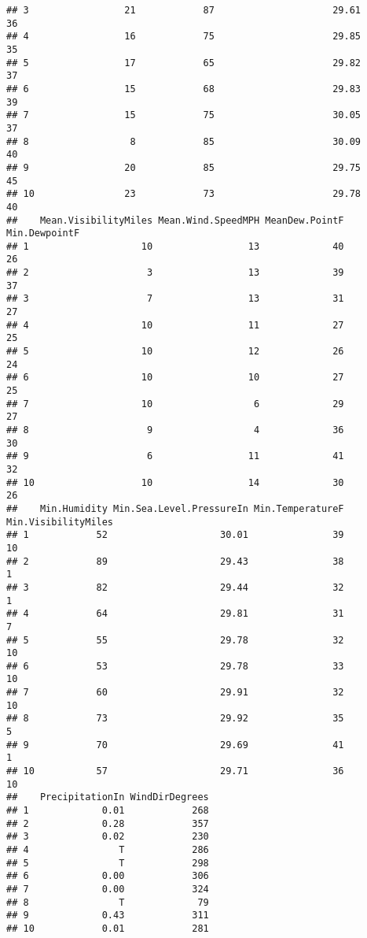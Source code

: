 \documentclass[
]{article}
\begin{document}
\begin{verbatim}
## 3                 21            87                     29.61                36
## 4                 16            75                     29.85                35
## 5                 17            65                     29.82                37
## 6                 15            68                     29.83                39
## 7                 15            75                     30.05                37
## 8                  8            85                     30.09                40
## 9                 20            85                     29.75                45
## 10                23            73                     29.78                40
##    Mean.VisibilityMiles Mean.Wind.SpeedMPH MeanDew.PointF Min.DewpointF
## 1                    10                 13             40            26
## 2                     3                 13             39            37
## 3                     7                 13             31            27
## 4                    10                 11             27            25
## 5                    10                 12             26            24
## 6                    10                 10             27            25
## 7                    10                  6             29            27
## 8                     9                  4             36            30
## 9                     6                 11             41            32
## 10                   10                 14             30            26
##    Min.Humidity Min.Sea.Level.PressureIn Min.TemperatureF Min.VisibilityMiles
## 1            52                    30.01               39                  10
## 2            89                    29.43               38                   1
## 3            82                    29.44               32                   1
## 4            64                    29.81               31                   7
## 5            55                    29.78               32                  10
## 6            53                    29.78               33                  10
## 7            60                    29.91               32                  10
## 8            73                    29.92               35                   5
## 9            70                    29.69               41                   1
## 10           57                    29.71               36                  10
##    PrecipitationIn WindDirDegrees
## 1             0.01            268
## 2             0.28            357
## 3             0.02            230
## 4                T            286
## 5                T            298
## 6             0.00            306
## 7             0.00            324
## 8                T             79
## 9             0.43            311
## 10            0.01            281
\end{verbatim}
\end{document}

